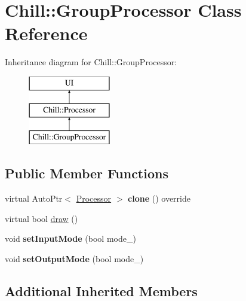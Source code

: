 \hypertarget{class_chill_1_1_group_processor}{}\section{Chill\+:\+:Group\+Processor Class Reference}
\label{class_chill_1_1_group_processor}
Inheritance diagram for Chill\+:\+:Group\+Processor\+:\begin{figure}[H]
\begin{center}
\leavevmode
\includegraphics[height=3.000000cm]{class_chill_1_1_group_processor}
\end{center}
\end{figure}
\subsection*{Public Member Functions}
\begin{DoxyCompactItemize}
\item 
\mbox{\label{class_chill_1_1_group_processor_a3d24966d2aa972cdceed46832c585039}} 
virtual Auto\+Ptr$<$ \mbox{\hyperlink{class_chill_1_1_processor}{Processor}} $>$ {\bfseries clone} () override
\item 
virtual bool \mbox{\hyperlink{class_chill_1_1_group_processor_a6c3eadfcb171c48a2d76bebefd153fcb}{draw}} ()
\item 
\mbox{\label{class_chill_1_1_group_processor_ab87cb5cbe1d8d41d3c85c93d57024ba9}} 
void {\bfseries set\+Input\+Mode} (bool mode\+\_\+)
\item 
\mbox{\label{class_chill_1_1_group_processor_a009f7866148cf7ed3c0957139bedded5}} 
void {\bfseries set\+Output\+Mode} (bool mode\+\_\+)
\end{DoxyCompactItemize}
\subsection*{Additional Inherited Members}


